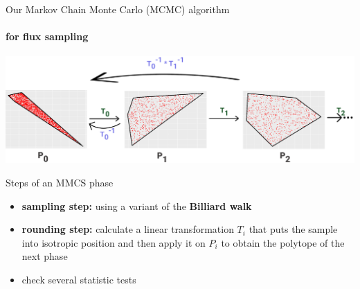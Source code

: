 \documentclass{beamer}
\begin{document}
   \begin{frame}{Our Markov Chain Monte Carlo (MCMC) algorithm}
      \framesubtitle{for flux sampling}

      \includegraphics[scale=0.11]{ ../met_nets/resources//sampling_extra_phase_croped_transparent.png}
      
      \scriptsize
      \begin{block}{Steps of an MMCS phase}
         \begin{itemize}
            \item \textbf{sampling step:} using a variant of the \textbf{Billiard walk}  
            \item \textbf{rounding step:} calculate a linear transformation $T_i$ that puts the sample into isotropic position and then apply it on $P_i$ to obtain the polytope of the next phase
            \item check several statistic tests
         \end{itemize}      

      \end{block}

   

   \end{frame}

      
\end{document}
